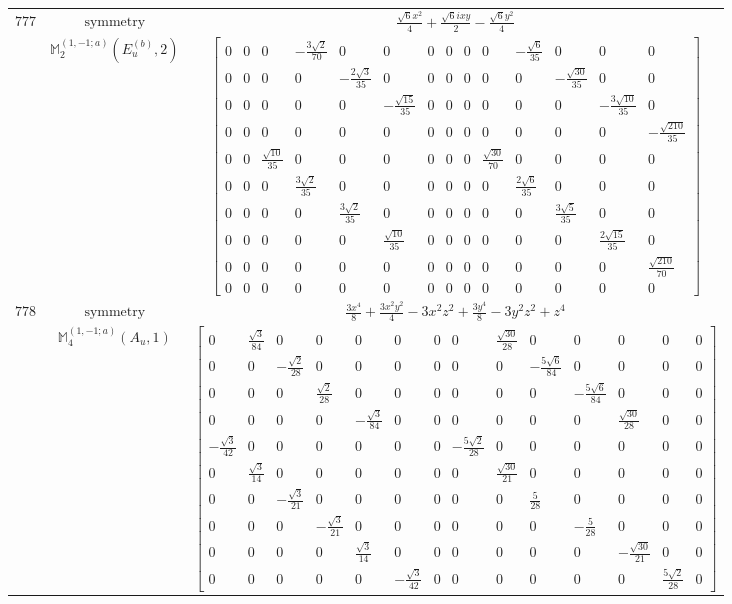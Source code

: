 \documentclass[fleqn,8pt,landscape]{jsarticle}
\begin{document}
\begin{longtable}{ccc}
$ 777 $ & $ \text{symmetry} $ & $ \frac{\sqrt{6} x^{2}}{4} + \frac{\sqrt{6} i x y}{2} - \frac{\sqrt{6} y^{2}}{4} $ \\
$  $ & $ \mathbb{M}_{2}^{(1,-1;a)}(E_{u}^{(b)},2) $ & $ \begin{bmatrix} 0 & 0 & 0 & - \frac{3 \sqrt{2}}{70} & 0 & 0 & 0 & 0 & 0 & 0 & - \frac{\sqrt{6}}{35} & 0 & 0 & 0 \\ 0 & 0 & 0 & 0 & - \frac{2 \sqrt{3}}{35} & 0 & 0 & 0 & 0 & 0 & 0 & - \frac{\sqrt{30}}{35} & 0 & 0 \\ 0 & 0 & 0 & 0 & 0 & - \frac{\sqrt{15}}{35} & 0 & 0 & 0 & 0 & 0 & 0 & - \frac{3 \sqrt{10}}{35} & 0 \\ 0 & 0 & 0 & 0 & 0 & 0 & 0 & 0 & 0 & 0 & 0 & 0 & 0 & - \frac{\sqrt{210}}{35} \\ 0 & 0 & \frac{\sqrt{10}}{35} & 0 & 0 & 0 & 0 & 0 & 0 & \frac{\sqrt{30}}{70} & 0 & 0 & 0 & 0 \\ 0 & 0 & 0 & \frac{3 \sqrt{2}}{35} & 0 & 0 & 0 & 0 & 0 & 0 & \frac{2 \sqrt{6}}{35} & 0 & 0 & 0 \\ 0 & 0 & 0 & 0 & \frac{3 \sqrt{2}}{35} & 0 & 0 & 0 & 0 & 0 & 0 & \frac{3 \sqrt{5}}{35} & 0 & 0 \\ 0 & 0 & 0 & 0 & 0 & \frac{\sqrt{10}}{35} & 0 & 0 & 0 & 0 & 0 & 0 & \frac{2 \sqrt{15}}{35} & 0 \\ 0 & 0 & 0 & 0 & 0 & 0 & 0 & 0 & 0 & 0 & 0 & 0 & 0 & \frac{\sqrt{210}}{70} \\ 0 & 0 & 0 & 0 & 0 & 0 & 0 & 0 & 0 & 0 & 0 & 0 & 0 & 0 \end{bmatrix} $ \\ \hline
$ 778 $ & $ \text{symmetry} $ & $ \frac{3 x^{4}}{8} + \frac{3 x^{2} y^{2}}{4} - 3 x^{2} z^{2} + \frac{3 y^{4}}{8} - 3 y^{2} z^{2} + z^{4} $ \\
$  $ & $ \mathbb{M}_{4}^{(1,-1;a)}(A_{u},1) $ & $ \begin{bmatrix} 0 & \frac{\sqrt{3}}{84} & 0 & 0 & 0 & 0 & 0 & 0 & \frac{\sqrt{30}}{28} & 0 & 0 & 0 & 0 & 0 \\ 0 & 0 & - \frac{\sqrt{2}}{28} & 0 & 0 & 0 & 0 & 0 & 0 & - \frac{5 \sqrt{6}}{84} & 0 & 0 & 0 & 0 \\ 0 & 0 & 0 & \frac{\sqrt{2}}{28} & 0 & 0 & 0 & 0 & 0 & 0 & - \frac{5 \sqrt{6}}{84} & 0 & 0 & 0 \\ 0 & 0 & 0 & 0 & - \frac{\sqrt{3}}{84} & 0 & 0 & 0 & 0 & 0 & 0 & \frac{\sqrt{30}}{28} & 0 & 0 \\ - \frac{\sqrt{3}}{42} & 0 & 0 & 0 & 0 & 0 & 0 & - \frac{5 \sqrt{2}}{28} & 0 & 0 & 0 & 0 & 0 & 0 \\ 0 & \frac{\sqrt{3}}{14} & 0 & 0 & 0 & 0 & 0 & 0 & \frac{\sqrt{30}}{21} & 0 & 0 & 0 & 0 & 0 \\ 0 & 0 & - \frac{\sqrt{3}}{21} & 0 & 0 & 0 & 0 & 0 & 0 & \frac{5}{28} & 0 & 0 & 0 & 0 \\ 0 & 0 & 0 & - \frac{\sqrt{3}}{21} & 0 & 0 & 0 & 0 & 0 & 0 & - \frac{5}{28} & 0 & 0 & 0 \\ 0 & 0 & 0 & 0 & \frac{\sqrt{3}}{14} & 0 & 0 & 0 & 0 & 0 & 0 & - \frac{\sqrt{30}}{21} & 0 & 0 \\ 0 & 0 & 0 & 0 & 0 & - \frac{\sqrt{3}}{42} & 0 & 0 & 0 & 0 & 0 & 0 & \frac{5 \sqrt{2}}{28} & 0 \end{bmatrix} $ \\ \hline

\end{longtable}
\end{document}
